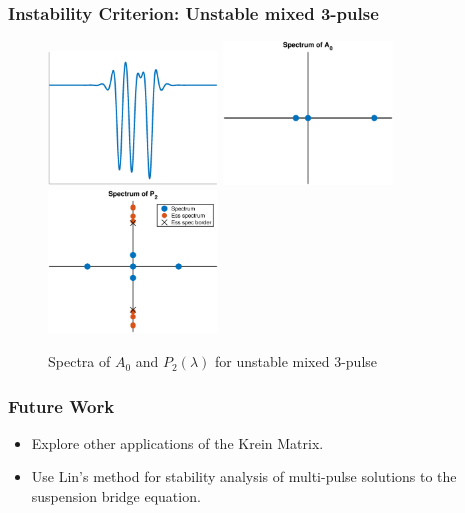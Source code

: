 \documentclass[16pt]{beamer}
\begin{document}
\begin{frame}
\frametitle{Instability Criterion: Unstable mixed 3-pulse}
\begin{figure}
\begin{center}
\includegraphics[width=4.5cm]{images/unstable2.eps}
\includegraphics[width=4.5cm]{images/unstable2A0.eps}
\includegraphics[width=4.5cm]{images/unstable2spec.eps}
\caption{Spectra of $A_0$ and $P_2(\lambda)$ for unstable mixed 3-pulse}
\end{center}
\end{figure}
\end{frame}

\begin{frame}
\frametitle{Future Work}
    \begin{itemize}
      \item Explore other applications of the Krein Matrix.
      \item Use Lin's method for stability analysis of multi-pulse solutions to the suspension bridge equation.
    \end{itemize} 
\end{frame}
\end{document}
